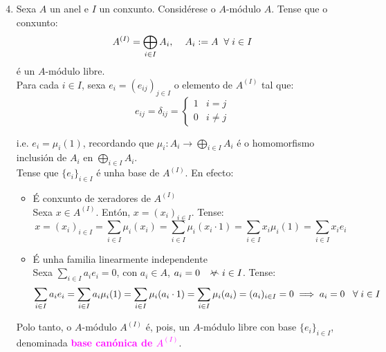 \documentclass[twoside]{report}
\newcommand{\magbf}[1]{\textcolor{magenta}{\textbf{#1}}} %
\newcommand{\almostall}{\mathrel{\vee\mkern-19mu\frown}} %
\theoremstyle{mystyle}
\begin{document}
\begin{enumerate}
    \setcounter{enumi}{3}
    \item Sexa $A$ un anel e $I$ un conxunto. Considérese o $A$-módulo $A$. Tense que o conxunto:
    $$A^{(I)} = \displaystyle \bigoplus_{i \in I} A_{i}, \hspace{4mm} A_{i} := A \hspace{2mm} \forall \hspace{1mm} i \in I$$
    é un $A$-módulo libre.\\
    
    Para cada $i \in I$, sexa $e_{i} = (e_{ij})_{j \in I}$ o elemento de $A^{(I)}$ tal que:
    $$e_{ij} = \delta_{ij} = 
    \begin{cases}
    1 & i = j\\
    0 & i \neq j
    \end{cases}$$
    
    i.e. $e_{i} = \mu_{i}(1)$, recordando que $\mu_{i}: A_{i} \longrightarrow \displaystyle \bigoplus_{i \in I} A_{i}$ é o homomorfismo inclusión de $A_{i}$ en $\displaystyle \bigoplus_{i \in I} A_{i}$.\\
    
    Tense que $\{e_{i}\}_{i \in I}$ é unha base de $A^{(I)}$. En efecto:
    
    \begin{itemize}
        \item É conxunto de xeradores de $A^{(I)}$\\
        
        Sexa $x \in A^{(I)}$. Entón, $x = (x_{i})_{i \in I}$. Tense:
        $$x = (x_{i})_{i \in I} = \displaystyle \sum_{i \in I} \mu_{i}(x_{i}) = \displaystyle \sum_{i \in I} \mu_{i}(x_{i} \cdot 1) = \displaystyle \sum_{i \in I} x_{i} \mu_{i}(1) = \displaystyle \sum_{i \in I} x_{i}e_{i}$$
        
        \item É unha familia linearmente independente\\
        
        Sexa $\displaystyle \sum_{i \in I} a_{i}e_{i} = 0$, con $a_{i} \in A$, $a_{i} = 0 \hspace{3mm} \almostall i \in I$. Tense:
        $$\displaystyle \sum_{i \in I} a_{i}e_{i} = \displaystyle \sum_{i \in I} a_{i} \mu_{i}(1) = \displaystyle \sum_{i \in I} \mu_{i}(a_{i} \cdot 1) = \displaystyle \sum_{i \in I} \mu_{i}(a_{i}) = (a_{i})_{i \in I} = 0 \implies a_{i} = 0 \hspace{3mm} \forall \hspace{1mm} i \in I$$
    \end{itemize}
    
    Polo tanto, o $A$-módulo $A^{(I)}$ é, pois, un $A$-módulo libre con base $\{e_{i}\}_{i \in I}$, denominada \magbf{base canónica de $A^{(I)}$}.\\
\end{enumerate}
\end{document}

